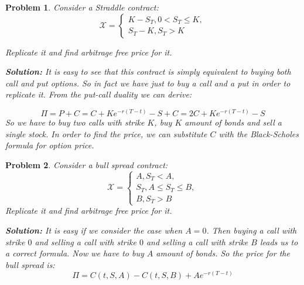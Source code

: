 \documentclass[a4paper, 12pt]{article}
\theoremstyle{problemstyle}
\newtheorem{problem}{Problem}[section]
\newenvironment{solution}
{\textit{\textbf{Solution:}}}
{}
\begin{document}
\begin{problem}
	Consider a Straddle contract:
	\begin{equation}
	\mathcal{X} = \begin{cases}
	K - S_T, 0 < S_T \leq K, \\
	S_T - K, S_T > K
	\end{cases}
	\end{equation}
	
	Replicate it and find arbitrage free price for it. 
	
	\begin{solution}
	It is easy to see that this contract is simply equivalent to buying both call and put options. So in fact we have just to buy a call and a put in order to replicate it. From the put-call duality we can derive:
	
	\begin{equation}
	\Pi = P + C = C + K e^{-r(T-t)} - S + C = 
	2C + K e^{-r(T-t)} - S
	\end{equation}
	So we have to buy two calls with strike $K$, buy $K$ amount of bonds and sell a single stock. In order to find the price, we can substitute $C$ with the Black-Scholes formula for option price. 
	\end{solution}
\end{problem}

\begin{problem}
	Consider a bull spread contract:
		\begin{equation}
	\mathcal{X} = \begin{cases}
	A, S_T < A, \\
	S_T , A \leq S_T \leq B, \\
	B, S_T > B
	\end{cases}
	\end{equation}
	Replicate it and find arbitrage free price for it. 
	
	\begin{solution}
		It is easy if we consider the case when $A=0$. Then buying a call with strike $0$ and selling a call with strike $0$ and selling a call with strike $B$ leads us to a correct formula. Now we have to buy $A$ amount of bonds. So the price for the bull spread is:
		\begin{equation}
		\Pi = C(t, S, A) - C(t, S, B) + Ae^{-r(T-t)} 
		\end{equation}
	\end{solution}
	
\end{problem}
\end{document}
